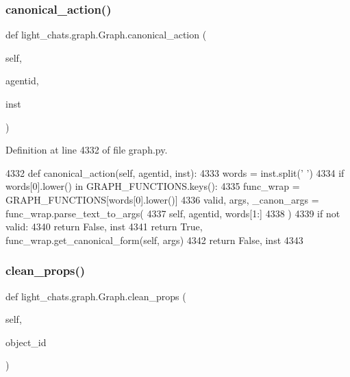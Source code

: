 \subsubsection{\texorpdfstring{canonical\+\_\+action()}{canonical\_action()}}
{\footnotesize\ttfamily def light\+\_\+chats.\+graph.\+Graph.\+canonical\+\_\+action (\begin{DoxyParamCaption}\item[{}]{self,  }\item[{}]{agentid,  }\item[{}]{inst }\end{DoxyParamCaption})}



Definition at line 4332 of file graph.\+py.


\begin{DoxyCode}
4332     \textcolor{keyword}{def }canonical\_action(self, agentid, inst):
4333         words = inst.split(\textcolor{stringliteral}{' '})
4334         \textcolor{keywordflow}{if} words[0].lower() \textcolor{keywordflow}{in} GRAPH\_FUNCTIONS.keys():
4335             func\_wrap = GRAPH\_FUNCTIONS[words[0].lower()]
4336             valid, args, \_canon\_args = func\_wrap.parse\_text\_to\_args(
4337                 self, agentid, words[1:]
4338             )
4339             \textcolor{keywordflow}{if} \textcolor{keywordflow}{not} valid:
4340                 \textcolor{keywordflow}{return} \textcolor{keyword}{False}, inst
4341             \textcolor{keywordflow}{return} \textcolor{keyword}{True}, func\_wrap.get\_canonical\_form(self, args)
4342         \textcolor{keywordflow}{return} \textcolor{keyword}{False}, inst
4343 
\end{DoxyCode}
\mbox{\label{classlight__chats_1_1graph_1_1Graph_aa28ea4b9a270d74783f277f04170d669}} 
\subsubsection{\texorpdfstring{clean\+\_\+props()}{clean\_props()}}
{\footnotesize\ttfamily def light\+\_\+chats.\+graph.\+Graph.\+clean\+\_\+props (\begin{DoxyParamCaption}\item[{}]{self,  }\item[{}]{object\+\_\+id }\end{DoxyParamCaption})}

